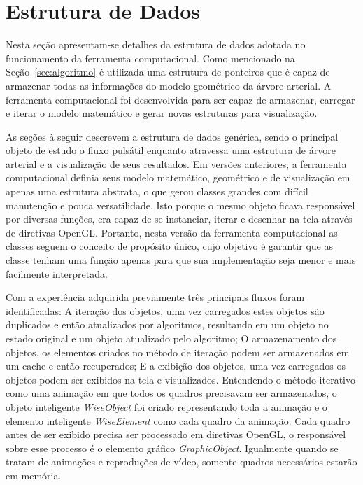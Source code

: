 \documentclass[a4paper,12pt]{monografia}
\theoremstyle{plain}
\theoremstyle{definition}
\theoremstyle{remark}
\begin{document}
\section{Estrutura de Dados}\label{sec:estrutura}

Nesta seção apresentam-se detalhes da estrutura de dados adotada no funcionamento da ferramenta computacional. Como mencionado na Seção~\ref{sec:algoritmo} é utilizada uma estrutura de ponteiros que é capaz de armazenar todas as informações do modelo geométrico da árvore arterial. A ferramenta computacional foi desenvolvida para ser capaz de armazenar, carregar e iterar o modelo matemático e gerar novas estruturas para visualização.

As seções à seguir descrevem a estrutura de dados genérica, sendo o principal objeto de estudo o fluxo pulsátil enquanto atravessa uma estrutura de árvore arterial e a visualização de seus resultados. Em versões anteriores, a ferramenta computacional  definia seus modelo matemático, geométrico e de visualização em apenas uma estrutura abstrata, o que gerou classes grandes com difícil manutenção e pouca versatilidade. Isto porque o mesmo objeto ficava responsável por diversas funções, era capaz de se instanciar, iterar e desenhar na tela através de diretivas OpenGL. Portanto, nesta versão da ferramenta computacional as classes seguem o conceito de propósito único, cujo objetivo é garantir que as classe tenham uma função apenas para que sua implementação seja menor e mais facilmente interpretada.

Com a experiência adquirida previamente três principais fluxos foram identificadas:  A iteração dos objetos, uma vez carregados estes objetos são duplicados e então atualizados por algoritmos, resultando em um objeto no estado original e um objeto atualizado pelo algoritmo; O armazenamento dos objetos, os elementos criados no método de iteração podem ser armazenados em um cache e então recuperados;  E a exibição dos objetos, uma vez carregados os objetos podem ser exibidos na tela e visualizados. Entendendo o método iterativo como uma animação em que todos os quadros precisavam ser armazenados, o objeto inteligente \textit{WiseObject} foi criado representando toda a animação e o elemento inteligente \textit{WiseElement} como cada quadro da animação. Cada quadro antes de ser exibido precisa ser processado em diretivas OpenGL, o responsável sobre esse processo é o elemento gráfico \textit{GraphicObject}. Igualmente quando se tratam de animações e reproduções de vídeo, somente quadros necessários estarão em memória. 
\end{document}
